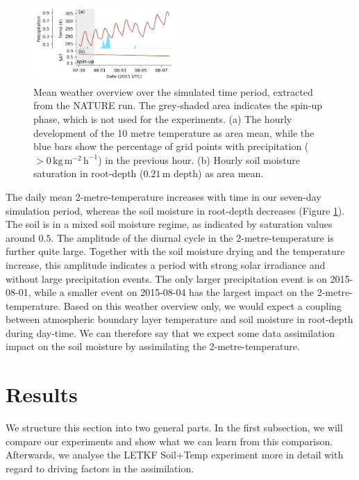 \documentclass[HESSD, manuscript]{copernicus}
\begin{document}
\begin{figure}
	\includegraphics[width=0.48\textwidth]{figures/fig_03_overview.png}
	\caption{
		Mean weather overview over the simulated time period, extracted from the NATURE run.
		The grey-shaded area indicates the spin-up phase, which is not used for the experiments.
		(a) The hourly development of the 10 metre temperature as area mean, while the blue bars show the percentage of grid points with precipitation ($> 0\,\text{kg}\,\text{m}^{-2}\,\text{h}^{-1}$) in the previous hour.
		(b) Hourly soil moisture saturation in root-depth ($0.21\,\text{m}$ depth) as area mean.
	}
	\label{fig:test_case_overview}
\end{figure}

The daily mean 2-metre-temperature increases with time in our seven-day simulation period, whereas the soil moisture in root-depth decreases (Figure \ref{fig:test_case_overview}).
The soil is in a mixed soil moisture regime, as indicated by saturation values around $0.5$.
The amplitude of the diurnal cycle in the 2-metre-temperature is further quite large.
Together with the soil moisture drying and the temperature increase, this amplitude indicates a period with strong solar irradiance and without large precipitation events.
The only larger precipitation event is on 2015-08-01, while a smaller event on 2015-08-04 has the largest impact on the 2-metre-temperature.
Based on this weather overview only, we would expect a coupling between atmospheric boundary layer temperature and soil moisture in root-depth during day-time.
We can therefore say that we expect some data assimilation impact on the soil moisture by assimilating the 2-metre-temperature.


\section{Results}\label{sec:results}

We structure this section into two general parts.
In the first subsection, we will compare our experiments and show what we can learn from this comparison.
Afterwards, we analyse the LETKF Soil+Temp experiment more in detail with regard to driving factors in the assimilation.\\
\end{document}

